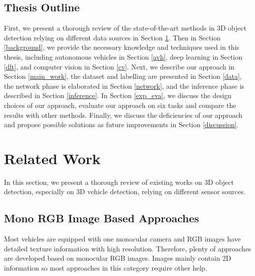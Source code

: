 \documentclass[a4paper,12pt]{article}
\begin{document}
\subsection{Thesis Outline}
First, we present a thorough review of the state-of-the-art methods in 3D object detection relying on different data sources in Section \ref{related_work}. Then in Section \ref{background}, we provide the necessary knowledge and techniques used in this thesis, including autonomous vehicles in Section \ref{avh}, deep learning in Section \ref{dlt}, and computer vision in Section \ref{cv}. Next, we describe our approach in Section \ref{main_work}, the dataset and labelling are presented in Section \ref{data}, the network phase is elaborated in Section \ref{network}, and the inference phase is described in Section \ref{inference}. In Section \ref{exp_eva}, we discuss the design choices of our approach, evaluate our approach on six tasks and compare the results with other methods. Finally, we discuss the deficiencies of our approach and propose possible solutions as future improvements in Section \ref{discussion}.
\clearpage

\section{Related Work}
\label{related_work}
In this section, we present a thorough review of existing works on 3D object detection, especially on 3D vehicle detection, relying on different sensor sources.

\subsection{Mono RGB Image Based Approaches}
Most vehicles are equipped with one monocular camera and RGB images have detailed texture information with high resolution. Therefore, plenty of approaches are developed based on monocular RGB images. Images mainly contain 2D information so most approaches in this category require other help. 
\end{document}
